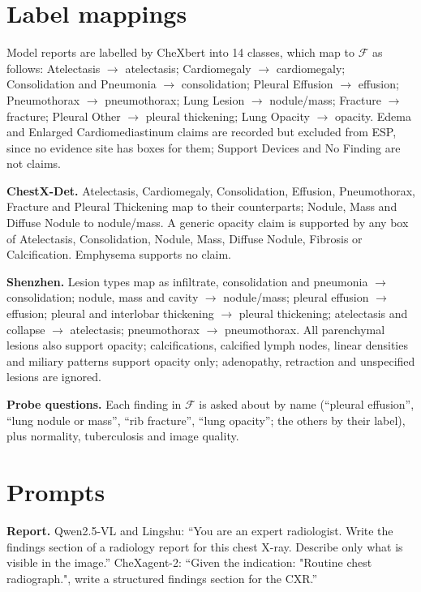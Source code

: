 \documentclass[pdflatex,sn-mathphys-num]{sn-jnl}
\theoremstyle{thmstyleone}
\begin{document}
\begin{appendices}

\section{Label mappings}\label{app:mapping}
Model reports are labelled by CheXbert into 14 classes, which map to $\mathcal{F}$ as follows: Atelectasis $\to$ atelectasis; Cardiomegaly $\to$ cardiomegaly; Consolidation and Pneumonia $\to$ consolidation; Pleural Effusion $\to$ effusion; Pneumothorax $\to$ pneumothorax; Lung Lesion $\to$ nodule/mass; Fracture $\to$ fracture; Pleural Other $\to$ pleural thickening; Lung Opacity $\to$ opacity. Edema and Enlarged Cardiomediastinum claims are recorded but excluded from ESP, since no evidence site has boxes for them; Support Devices and No Finding are not claims.

\textbf{ChestX-Det.} Atelectasis, Cardiomegaly, Consolidation, Effusion, Pneumothorax, Fracture and Pleural Thickening map to their counterparts; Nodule, Mass and Diffuse Nodule to nodule/mass. A generic opacity claim is supported by any box of Atelectasis, Consolidation, Nodule, Mass, Diffuse Nodule, Fibrosis or Calcification. Emphysema supports no claim.

\textbf{Shenzhen.} Lesion types map as infiltrate, consolidation and pneumonia $\to$ consolidation; nodule, mass and cavity $\to$ nodule/mass; pleural effusion $\to$ effusion; pleural and interlobar thickening $\to$ pleural thickening; atelectasis and collapse $\to$ atelectasis; pneumothorax $\to$ pneumothorax. All parenchymal lesions also support opacity; calcifications, calcified lymph nodes, linear densities and miliary patterns support opacity only; adenopathy, retraction and unspecified lesions are ignored.

\textbf{Probe questions.} Each finding in $\mathcal{F}$ is asked about by name (``pleural effusion'', ``lung nodule or mass'', ``rib fracture'', ``lung opacity''; the others by their label), plus normality, tuberculosis and image quality.

\section{Prompts}\label{app:prompts}
\textbf{Report.} Qwen2.5-VL and Lingshu: ``You are an expert radiologist. Write the findings section of a radiology report for this chest X-ray. Describe only what is visible in the image.'' CheXagent-2: ``Given the indication: "Routine chest radiograph.", write a structured findings section for the CXR.''


\end{appendices}
\end{document}
